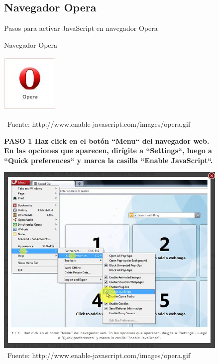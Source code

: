 \documentclass[11pt]{article} %
\begin{document}
\begin{figure}
\subsection{Navegador Opera}
Pasos para activar JavaScript en navegador Opera
\begin{center}
\begin{center}
Navegador Opera

\end{center}
\begin{center}
\includegraphics[height=3 cm, width=3 cm] {imagenes/opera.JPG}
\end{center}


\ Fuente: {http://www.enable-javascript.com/images/opera.gif}
\newline

\begin{center}
\bf PASO 1  Haz click en el botón ``Menu`` del navegador web. En las opciones que aparecen, dirígite a ``Settings``, luego a ``Quick preferences`` y marca la casilla ``Enable JavaScript``.
\end{center}
\includegraphics[height=8 cm, width=8 cm] {imagenes/opera 01.JPG}
\newline
\ Fuente: {http://www.enable-javascript.com/images/opera.gif}

\end{center}
\end{figure}
\end{document}
